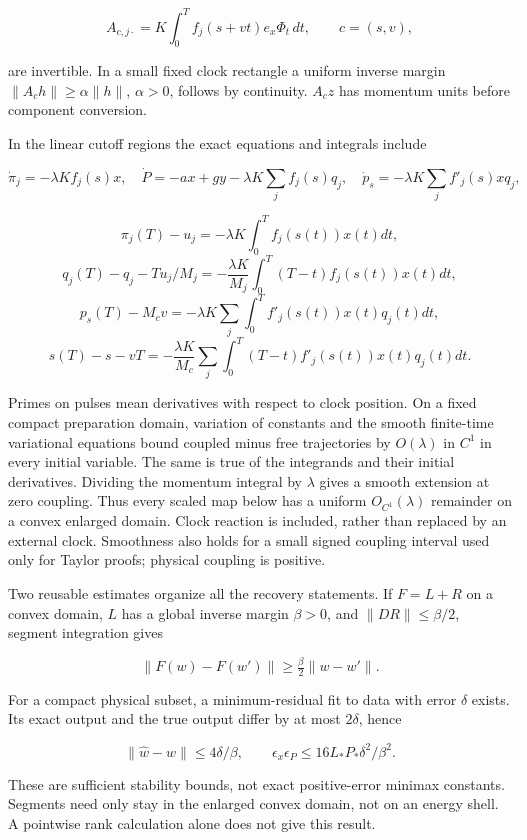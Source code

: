 \documentclass[11pt,a4paper]{article}
\begin{document}
\[A_{c,j\cdot}=K\int_0^T f_j(s+vt)e_x\Phi_t\,dt,\qquad c=(s,v),\]

are invertible. In a small fixed clock rectangle a uniform inverse
margin \(\|A_ch\|\ge\alpha\|h\|\), \(\alpha>0\), follows by continuity.
\(A_cz\) has momentum units before component conversion.

In the linear cutoff regions the exact equations and integrals include

\[\dot\pi_j=-\lambda Kf_j(s)x,\quad
\dot P=-ax+gy-\lambda K\sum_jf_j(s)q_j,\quad
\dot p_s=-\lambda K\sum_jf'_j(s)xq_j,\]

\[\pi_j(T)-u_j=-\lambda K\int_0^T f_j(s(t))x(t)dt,\]
\[q_j(T)-q_j-Tu_j/M_j
=-\frac{\lambda K}{M_j}\int_0^T(T-t)f_j(s(t))x(t)dt,\]
\[p_s(T)-M_cv=-\lambda K\sum_j\int_0^T f'_j(s(t))x(t)q_j(t)dt,\]
\[s(T)-s-vT=-\frac{\lambda K}{M_c}\sum_j
 \int_0^T(T-t)f'_j(s(t))x(t)q_j(t)dt.\]

Primes on pulses mean derivatives with respect to clock position. On a
fixed compact preparation domain, variation of constants and the smooth
finite-time variational equations bound coupled minus free trajectories
by \(O(\lambda)\) in \(C^1\) in every initial variable. The same is true
of the integrands and their initial derivatives. Dividing the momentum
integral by \(\lambda\) gives a smooth extension at zero coupling. Thus
every scaled map below has a uniform \(O_{C^1}(\lambda)\) remainder on a
convex enlarged domain. Clock reaction is included, rather than replaced
by an external clock. Smoothness also holds for a small signed coupling
interval used only for Taylor proofs; physical coupling is positive.

Two reusable estimates organize all the recovery statements. If
\(F=L+R\) on a convex domain, \(L\) has a global inverse margin
\(\beta>0\), and \(\|DR\|\le\beta/2\), segment integration gives

\[\|F(w)-F(w')\|\ge\tfrac\beta2\|w-w'\|.\]

For a compact physical subset, a minimum-residual fit to data with error
\(\delta\) exists. Its exact output and the true output differ by at
most \(2\delta\), hence

\[\|\widehat w-w\|\le4\delta/\beta,\qquad
\epsilon_x\epsilon_P\le16L_*P_*\delta^2/\beta^2.\]

These are sufficient stability bounds, not exact positive-error minimax
constants. Segments need only stay in the enlarged convex domain, not on
an energy shell. A pointwise rank calculation alone does not give this
result.
\end{document}
